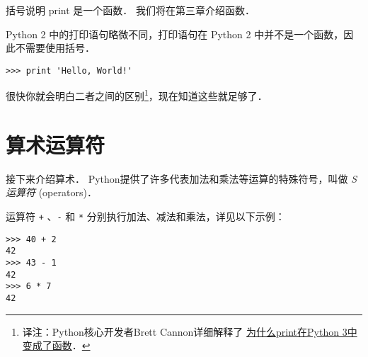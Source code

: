 
括号说明 print 是一个函数． 我们将在第三章介绍函数．
 
 


Python 2 中的打印语句略微不同，打印语句在 Python 2 中并不是一个函数，因此不需要使用括号．

\begin{lstlisting}
>>> print 'Hello, World!'
\end{lstlisting}

%

很快你就会明白二者之间的区别\footnote{译注：Python核心开发者Brett Cannon详细解释了 \href{http://codingpy.com/article/why-print-became-a-function-in-python-3/}{为什么print在Python 3中变成了函数}． }，现在知道这些就足够了．

\section{算术运算符}
  
  


接下来介绍算术． Python提供了许多代表加法和乘法等运算的特殊符号，叫做 {\em S运算符} (operators)．


运算符 \lstinline{+} 、\lstinline{-} 和 \lstinline{*} 分别执行加法、减法和乘法，详见以下示例：

\begin{lstlisting}
>>> 40 + 2
42
>>> 43 - 1
42
>>> 6 * 7
42
\end{lstlisting}

